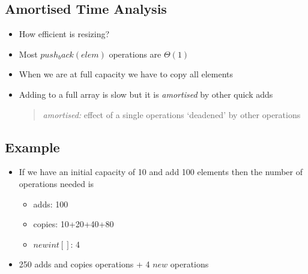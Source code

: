 
\begin{slide}
\section{Amortised Time Analysis}
\begin{PauseHighLight}
  \begin{itemize}
  \item How efficient is resizing?\pause
  \item Most \jl$push_back(elem)$ operations are $\Theta(1)$\pause
  \item When we are at full capacity we have to copy all elements\pause
  \item Adding to a full array is slow but it is \emph{amortised} by
    other quick adds\pause
    \begin{quote}
      \emph{amortised:} effect of a single operations `deadened' by
      other operations\pause
    \end{quote}
  \end{itemize}
\end{PauseHighLight}

\end{slide}


\begin{slide}
\section{Example}

\pausebuild
\begin{itemize}
\item If we have an initial capacity of 10 and add 100 elements then the
  number of operations needed is
  \begin{itemize}
  \item adds: 100\pause
  \item copies: 10\pause+20\pause+40\pause+80\pauseb
  \item \jl$new int[]$: 4\pause
  \end{itemize}
\item 250 adds and copies operations + 4 \jl$new$ operations\pause
\end{itemize}


\end{slide}

